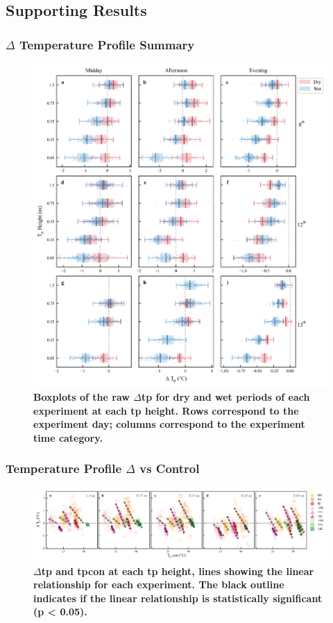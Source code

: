 \documentclass[final,3p,times,authoryear]{elsarticle}
\begin{document}
{\subsection{Supporting Results}\label{sec:appendix7.5}
\subsubsection{$\Delta$ Temperature Profile Summary}\label{sec:appendix7.5.1}

\begin{figure}
\centering
\includegraphics[trim={0 0 0 0},clip,scale=1.0]{pict038.png}
\caption{\bf Boxplots of the raw $\Delta$\gls{tp} for dry and wet periods of each experiment at each \gls{tp} height. Rows
correspond to the experiment day; columns correspond to the experiment time category.}
 \label{fig:7.9}
\end{figure}

\subsubsection{Temperature Profile $\Delta$ vs Control}\label{sec:appendix7.5.2}

\begin{figure}
\centering
\includegraphics[trim={0 0 0 0},clip,scale=1.0]{pict039.png}
\caption{\bf $\Delta$\gls{tp} and \gls{tpcon} at each \gls{tp} height, lines showing the linear relationship for each experiment.
The black outline indicates if the linear relationship is statistically significant (p < 0.05).}
 \label{fig:7.10}
\end{figure}


}
\end{document}
